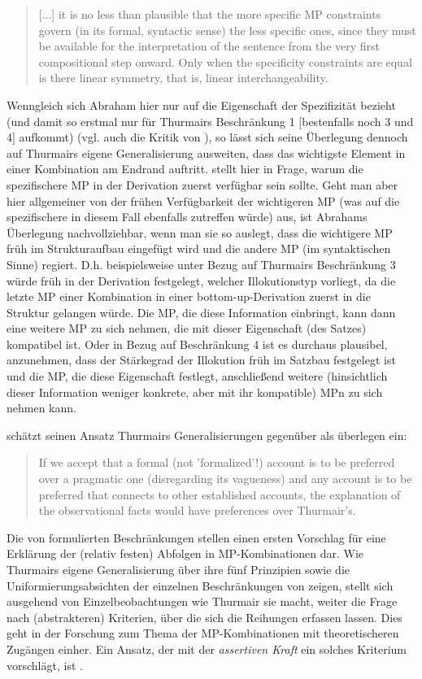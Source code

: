 \begin{quotation}
[...] it is no less than plausible that the more specific MP constraints \\ govern (in its formal, syntactic sense) the less specific ones, since they must be available for the interpretation of the sentence from the very first compositional step onward. Only when the specificity constraints are equal is there linear symmetry, that is, linear interchangeability.
\end{quotation}
Wenngleich sich Abraham hier nur auf die Eigenschaft der Spezifizität bezieht (und damit so erstmal nur für Thurmairs Beschränkung 1 $[$bestenfalls noch 3 und 4$]$ aufkommt) (vgl. auch die Kritik von \citealt[229]{Rinas2006}), so lässt sich seine Überlegung dennoch auf Thurmairs eigene Generalisierung ausweiten, dass das wichtigste Element in einer Kombination am Endrand auftritt. \citet[229]{Rinas2006} stellt hier in Frage, warum die spezifischere MP in der Derivation zuerst verfügbar sein sollte. Geht man aber hier allgemeiner von der frühen Verfügbarkeit der wichtigeren MP (was auf die spezifischere in diesem Fall ebenfalls zu\-treffen würde) aus, ist Abrahams Überlegung nachvollziehbar, wenn man sie so auslegt, dass die wichtigere MP früh im Strukturaufbau eingefügt wird und die andere MP (im syntaktischen Sinne) regiert. D.h. beispielsweise unter Bezug auf Thurmairs Beschränkung 3 würde früh in der Derivation festgelegt, welcher Illokutionstyp vorliegt, da die letzte MP einer Kombination in einer bottom-up-Derivation zuerst in die Struktur gelangen würde. Die MP, die diese Information einbringt, kann dann eine weitere MP zu sich nehmen, die mit dieser Eigenschaft (des Satzes) kompatibel ist. Oder in Bezug auf Beschränkung 4 ist es durchaus plausibel, anzunehmen, dass der Stärkegrad der Illokution früh im Satzbau festgelegt ist und die MP, die diese Eigenschaft festlegt, anschließend weitere (hinsichtlich dieser Information weniger konkrete, aber mit ihr kompatible) MPn zu sich neh\-men kann.

\citet[118]{Abraham1991a} schätzt seinen Ansatz Thurmairs Generalisierungen gegen\-über als überlegen ein:
\begin{quotation}
If we accept that a formal (not 'formalized'!) account is to be preferred over a pragmatic one (disregarding its vagueness) and any account is to be preferred that connects to other established accounts, the explanation of the observational facts would have preferences over Thurmair’s.
\end{quotation}
Die von \citet{Thurmair1989, Thurmair1991} formulierten Beschränkungen stellen einen ersten Vorschlag für eine Erklärung der (relativ festen) Abfolgen in MP-Kombinationen dar. Wie Thurmairs eigene Generalisierung über ihre fünf Prinzipien sowie die Uniformierungsabsichten der einzelnen Beschränkungen von \citet{Abraham1991a} zeigen, stellt sich ausgehend von Einzelbeobachtungen wie Thurmair sie macht, weiter die Frage nach (abstrakteren) Kriterien, über die sich die Reihungen erfassen lassen. Dies geht in der Forschung zum Thema der MP-Kombinationen mit theoretischeren Zugängen einher. Ein Ansatz, der mit der \textit{assertiven Kraft} ein solches Kriterium vorschlägt, ist \citet{Doherty1985, Doherty1987}.

